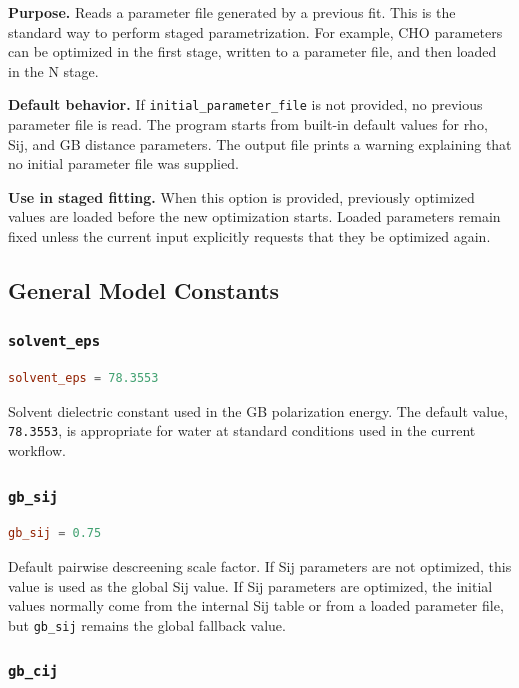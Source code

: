 \documentclass[11pt]{article}
\begin{document}
\textbf{Purpose.}
Reads a parameter file generated by a previous fit. This is the standard way to
perform staged parametrization. For example, CHO parameters can be optimized in
the first stage, written to a parameter file, and then loaded in the N stage.

\textbf{Default behavior.}
If \texttt{initial\_parameter\_file} is not provided, no previous parameter file
is read. The program starts from built-in default values for rho, Sij, and GB
distance parameters. The output file prints a warning explaining that no initial
parameter file was supplied.

\textbf{Use in staged fitting.}
When this option is provided, previously optimized values are loaded before the
new optimization starts. Loaded parameters remain fixed unless the current input
explicitly requests that they be optimized again.

\subsection{General Model Constants}

\subsubsection{\texttt{solvent\_eps}}

\begin{lstlisting}[language=toml]
solvent_eps = 78.3553
\end{lstlisting}

Solvent dielectric constant used in the GB polarization energy. The default
value, \texttt{78.3553}, is appropriate for water at standard conditions used in
the current workflow.

\subsubsection{\texttt{gb\_sij}}

\begin{lstlisting}[language=toml]
gb_sij = 0.75
\end{lstlisting}

Default pairwise descreening scale factor. If Sij parameters are not optimized,
this value is used as the global Sij value. If Sij parameters are optimized, the
initial values normally come from the internal Sij table or from a loaded
parameter file, but \texttt{gb\_sij} remains the global fallback value.

\subsubsection{\texttt{gb\_cij}}
\end{document}
